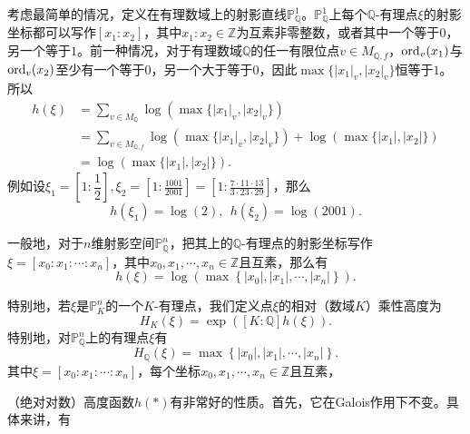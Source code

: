 \begin{example}
考虑最简单的情况，定义在有理数域上的射影直线$\mathbb{P}_{\mathbb{Q}}^1$。$\mathbb{P}_{\mathbb{Q}}^1$上每个$\mathbb{Q}$-有理点$\xi$的射影坐标都可以写作$[x_1:x_2]$，其中$x_1:x_2\in\mathbb{Z}$为互素非零整数，或者其中一个等于$0$，另一个等于$1$。前一种情况，对于有理数域$\mathbb{Q}$的任一有限位点$v\in M_{\mathbb{Q},f}$，$\operatorname{ord}_v(x_1)$与$\operatorname{ord}_v(x_2)$至少有一个等于0，另一个大于等于$0$，因此$\max\{|x_1|_v,|x_2|_v\}$恒等于$1$。所以
\begin{align}
h(\xi) & = \sum\limits_{v\in M_{\mathbb{Q}}}\log\left(\max\{|x_1|_v,|x_2|_v\}\right) \\
& = \sum\limits_{v\in M_{\mathbb{Q},f}} \log\left(\max\{|x_1|_v,|x_2|_v\}\right) + \log\left(\max\{|x_1|,|x_2|\}\right) \\
& = \log\left(\max\{|x_1|,|x_2|\}\right).
\end{align}
例如设$\xi_1 = [1:\dfrac{1}{2}], \xi_2 = [1:\frac{1001}{2001}] = [1:\frac{7\cdot11\cdot13}{3\cdot23\cdot29}]$，那么
\begin{equation}
h(\xi_1) = \log(2), ~~ h(\xi_2) = \log(2001).
\end{equation}

一般地，对于$n$维射影空间$\mathbb{P}_{\mathbb{Q}}^n$，把其上的$\mathbb{Q}$-有理点的射影坐标写作$\xi = [x_0:x_1:\cdots:x_n]$，其中$x_0,x_1,\cdots,x_n\in \mathbb{Z}$且互素，那么有
\begin{equation} \label{log height on Q}
h(\xi) = \log\left( \max\left\{|x_0|, |x_1|, \cdots, |x_n|\right\} \right).
\end{equation}
\end{example}

特别地，若$\xi$是$\mathbb P^n_K$的一个$K$-有理点，我们定义点$\xi$的相对（数域$K$）乘性高度为
\begin{equation} \label{relative multiplicative height}
H_K(\xi) = \exp\left([K:\mathbb{Q}]h(\xi)\right).
\end{equation}
特别地，对$\mathbb{P}_{\mathbb{Q}}^n$上的有理点$\xi$有
\begin{equation} \label{multiplicative height on Q}
H_{\mathbb{Q}}(\xi) = \max\left\{|x_0|, |x_1|, \cdots, |x_n|\right\}.
\end{equation}
其中$\xi = [x_0:x_1:\cdots:x_n]$，每个坐标$x_0,x_1,\cdots,x_n\in \mathbb{Z}$且互素，

（绝对对数）高度函数$h(\ast)$有非常好的性质。首先，它在Galois作用下不变。具体来讲，有

